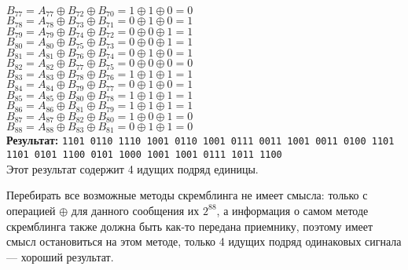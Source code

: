 $B_{77}=A_{77}\oplus B_{72}\oplus B_{70}=1\oplus 1\oplus 0=0$\\
$B_{78}=A_{78}\oplus B_{73}\oplus B_{71}=0\oplus 1\oplus 0=1$\\
$B_{79}=A_{79}\oplus B_{74}\oplus B_{72}=0\oplus 0\oplus 1=1$\\
$B_{80}=A_{80}\oplus B_{75}\oplus B_{73}=0\oplus 0\oplus 1=1$\\
$B_{81}=A_{81}\oplus B_{76}\oplus B_{74}=0\oplus 1\oplus 0=1$\\
$B_{82}=A_{82}\oplus B_{77}\oplus B_{75}=0\oplus 0\oplus 0=0$\\
$B_{83}=A_{83}\oplus B_{78}\oplus B_{76}=1\oplus 1\oplus 1=1$\\
$B_{84}=A_{84}\oplus B_{79}\oplus B_{77}=0\oplus 1\oplus 0=1$\\
$B_{85}=A_{85}\oplus B_{80}\oplus B_{78}=1\oplus 1\oplus 1=1$\\
$B_{86}=A_{86}\oplus B_{81}\oplus B_{79}=1\oplus 1\oplus 1=1$\\
$B_{87}=A_{87}\oplus B_{82}\oplus B_{80}=1\oplus 0\oplus 1=0$\\
$B_{88}=A_{88}\oplus B_{83}\oplus B_{81}=0\oplus 1\oplus 1=0$\\

\textbf{Результат:} \texttt{1101 0110 1110 1001 0110 1001 0111 0011 1001 0011 0100 1101 1101 0101 1100 0101 1000 1001 1001 0111 1011 1100}\\
Этот результат содержит 4 идущих подряд единицы.

Перебирать все возможные методы скремблинга не имеет смысла: только с операцией $\oplus$ для
данного сообщения их $2^{88}$, а информация о самом методе скремблинга также должна быть как-то передана приемнику,
поэтому имеет смысл остановиться на этом методе, только 4 идущих подряд одинаковых сигнала --- хороший результат.
